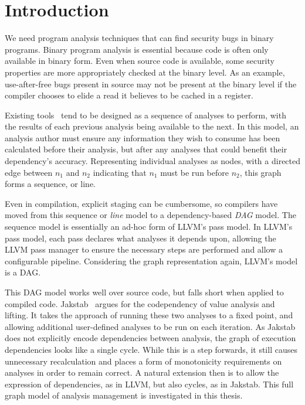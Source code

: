 \chapter{Introduction}
We need program analysis techniques that can find security bugs in binary programs.
Binary program analysis is essential because code is often only available in binary form.
Even when source code is available, some security properties are more appropriately checked at the binary level.
As an example, use-after-free bugs present in source may not be present at the binary level if the compiler chooses to elide a read it believes to be cached in a register.

Existing tools~\cite{ida, bap, bitblaze, bindead} tend to be designed as a sequence of analyses to perform, with the results of each previous analysis being available to the next.
In this model, an analysis author must ensure any information they wish to consume has been calculated before their analysis, but after any analyses that could benefit their dependency's accuracy.
Representing individual analyses as nodes, with a directed edge between $n_1$ and $n_2$ indicating that $n_1$ must be run before $n_2$, this graph forms a sequence, or line.

Even in compilation, explicit staging can be cumbersome, so compilers have moved from this sequence or \emph{line} model to a dependency-based \emph{DAG} model.
The sequence model is essentially an ad-hoc form of LLVM\cite{llvm}'s pass model.
In LLVM's pass model, each pass declares what analyses it depends upon, allowing the LLVM pass manager to ensure the necessary steps are performed and allow a configurable pipeline.
Considering the graph representation again, LLVM's model is a DAG.

This DAG model works well over source code, but falls short when applied to compiled code.
Jakstab~\cite{jakstab} argues for the codependency of value analysis and lifting. 
It takes the approach of running these two analyses to a fixed point, and allowing additional user-defined analyses to be run on each iteration.
As Jakstab does not explicitly encode dependencies between analysis, the graph of execution dependencies looks like a single cycle.
While this is a step forwards, it still causes unnecessary recalculation and places a form of monotonicity requirements on analyses in order to remain correct.
A natural extension then is to allow the expression of dependencies, as in LLVM, but also cycles, as in Jakstab.
This full graph model of analysis management is investigated in this thesis.

